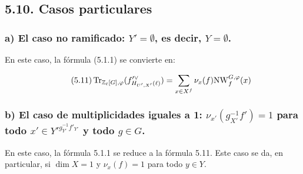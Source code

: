 \subsection*{5.10. Casos particulares}
\subsubsection*{a) El caso no ramificado: $Y' = \emptyset$, es decir, $Y = \emptyset$.}

En este caso, la fórmula (5.1.1) se convierte en:

\begin{equation}\tag{5.11}
\operatorname{Tr}_{\mathbb Z_\ell[G],\varphi}(f'^\vee_{H_{U',X'}(\ell)}) = \sum_{x \in X^f} \nu_x(f) \mathrm{NW}_f^{G,\varphi}(x)
\end{equation}

\subsubsection*{b) El caso de multiplicidades iguales a 1: $\nu_{x'}(g_{X'}^{-1}f') = 1$ para todo $x'\in {Y'}^{g_{Y'}^{-1}f'_{Y'}}$ y todo $g\in G$.}

En este caso, la fórmula 5.1.1 se reduce a la fórmula 5.11. Este caso se da, en particular, si $\dim X = 1$ y $\nu_x(f)=1$ para todo $y\in Y$.%
